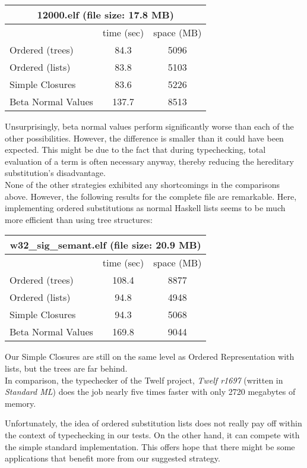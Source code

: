 \documentclass[submission,copyright,creativecommons]{eptcs}
\begin{document}
{\begin{center}
\begin{tabular}{| l || c | c |}
\multicolumn{3}{c}{\textsf{12000.elf} (file size: 17.8 MB)}\\
\hline
& time (sec) & space (MB) \\
\hline
\hline
Ordered (trees) & 84.3 & 5096 \\
\hline
Ordered (lists) & 83.8 & 5103 \\
\hline
Simple Closures & 83.6 & 5226 \\
\hline
Beta Normal Values & 137.7 & 8513 \\
\hline
\end{tabular}
\end{center}
Unsurprisingly, beta normal values perform significantly worse than each of the other possibilities. However, the difference is smaller than it could have been expected. This might be due to the fact that during typechecking, total evaluation of a term is often necessary anyway, thereby reducing the hereditary substitution's disadvantage. \\
None of the other strategies exhibited any shortcomings in the comparisons above. However, the following results for the complete file are remarkable. Here, implementing ordered substitutions as normal Haskell lists seems to be much more efficient than using tree structures: 
\begin{center}
 \begin{tabular}{| l || c | c |}
\multicolumn{3}{c}{\textsf{w32\_sig\_semant.elf} (file size: 20.9 MB)}\\
\hline
& time (sec) & space (MB) \\
\hline
\hline
Ordered (trees) & 108.4 & 8877\\
\hline
Ordered (lists) & 94.8 & 4948\\ %
\hline
Simple Closures & 94.3 & 5068 \\ %
\hline
Beta Normal Values & 169.8 & 9044  \\
\hline
\end{tabular}
\end{center}
Our Simple Closures are still on the same level as Ordered Representation with lists, but the trees are far behind. 
\\
In comparison, the typechecker of the Twelf project, \emph{Twelf r1697} (written in \emph{Standard ML}) does the job nearly five times faster with only 2720 megabytes of memory.

Unfortunately, the idea of ordered substitution lists does not really pay off within the context of typechecking in our tests. 
On the other hand, it can compete with the simple standard implementation. This offers hope that there might be some applications that benefit more from our suggested strategy. 
}
\end{document}
